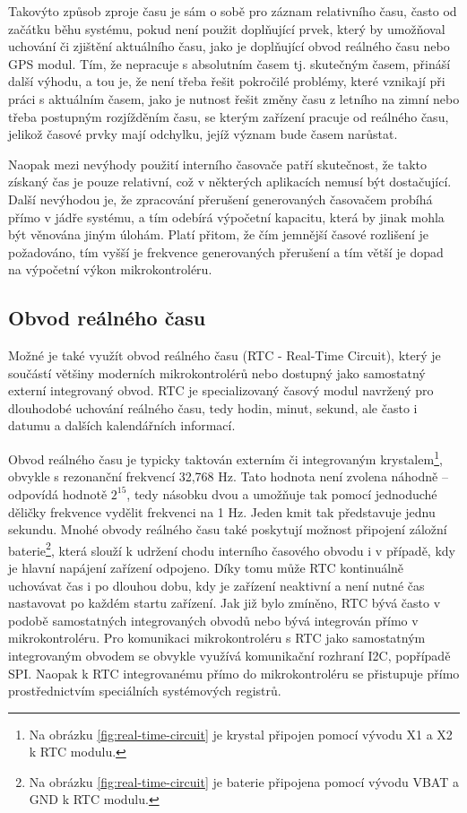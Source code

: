 Takovýto způsob zproje času je sám o sobě pro záznam relativního času, často od začátku běhu systému, pokud není použit doplňující prvek, který by umožňoval uchování či zjištění aktuálního času, jako je doplňující obvod reálného času nebo GPS modul. Tím, že nepracuje s absolutním časem tj. skutečným časem, přináší další výhodu, a tou je, že není třeba řešit pokročilé problémy, které vznikají při práci s aktuálním časem, jako je nutnost řešit změny času z letního na zimní nebo třeba postupným rozjížděním času, se kterým zařízení pracuje od reálného času, jelikož časové prvky mají odchylku, jejíž význam bude časem narůstat.

Naopak mezi nevýhody použití interního časovače patří skutečnost, že takto získaný čas je pouze relativní, což v některých aplikacích nemusí být dostačující. Další nevýhodou je, že zpracování přerušení generovaných časovačem probíhá přímo v jádře systému, a tím odebírá výpočetní kapacitu, která by jinak mohla být věnována jiným úlohám. Platí přitom, že čím jemnější časové rozlišení je požadováno, tím vyšší je frekvence generovaných přerušení a tím větší je dopad na výpočetní výkon mikrokontroléru.

\subsection{Obvod reálného času}
Možné je také využít obvod reálného času (RTC - Real-Time Circuit), který je součástí většiny moderních mikrokontrolérů nebo dostupný jako samostatný externí integrovaný obvod. RTC je specializovaný časový modul navržený pro dlouhodobé uchování reálného času, tedy hodin, minut, sekund, ale často i datumu a dalších kalendářních informací.

Obvod reálného času je typicky taktován externím či integrovaným krystalem\footnote{Na obrázku \ref{fig:real-time-circuit} je krystal připojen pomocí vývodu X1 a X2 k RTC modulu.}, obvykle s rezonanční frekvencí 32,768 Hz. Tato hodnota není zvolena náhodně – odpovídá hodnotě $2^{15}$, tedy násobku dvou a umožňuje tak pomocí jednoduché děličky frekvence vydělit frekvenci na 1 Hz. Jeden kmit tak představuje jednu sekundu. Mnohé obvody reálného času také poskytují možnost připojení záložní baterie\footnote{Na obrázku \ref{fig:real-time-circuit} je baterie připojena pomocí vývodu VBAT a GND k RTC modulu.}, která slouží k udržení chodu interního časového obvodu i v případě, kdy je hlavní napájení zařízení odpojeno. Díky tomu může RTC kontinuálně uchovávat čas i po dlouhou dobu, kdy je zařízení neaktivní a není nutné čas nastavovat po každém startu zařízení. Jak již bylo zmíněno, RTC bývá často v podobě samostatných integrovaných obvodů nebo bývá integrován přímo v mikrokontroléru. Pro komunikaci mikrokontroléru s RTC jako samostatným integrovaným obvodem se obvykle využívá komunikační rozhraní I2C, popřípadě SPI. Naopak k RTC integrovanému přímo do mikrokontroléru se přistupuje přímo prostřednictvím speciálních systémových registrů. \cite{jameco_choosing_right_real_time_clock_chip_or_module, yxc_role_of_32768_freq_in_the_circuit, medium_rtc}

